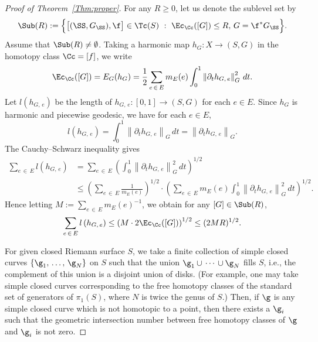 \begin{proof}[{Proof of Theorem~\ref{Thm:proper}}]
For any $R \ge 0$, let us denote the sublevel set by
\[
\Sub(R):=\Big\{\big[(\SS, G_\SS), \f\big] \in \Tc(S) \ : \ \Ec_\Cc([G]) \le R, \, G=\f^\ast G_\SS\Big\}.
\]
Assume that $\Sub(R) \neq \emptyset$. Taking a harmonic map $h_G: X \to (S, G)$ in the homotopy class $\Cc=[f]$, we write
\[
\Ec_\Cc([G])=E_G(h_G)=\frac{1}{2}\sum_{e\,\in \,E}m_E(e)\int_0^1\left\|\partial_t h_{G,\,e}\right\|_G^2\, dt.
\]
Let $l(h_{G,\,e})$ be the length of $h_{G, \,e}:[0, 1] \to (S, G)$ for each $e \in E$. Since $h_G$ is harmonic and piecewise geodesic, we have for each $e \in E$,
\[
l\left(h_{G,\,e}\right)=\int_0^1\left\|\partial_t h_{G,\,e}\right\|_G\, dt=\left\|\partial_t h_{G,\,e}\right\|_G.
\]
The Cauchy--Schwarz inequality gives
\begin{align*}
\sum_{e\,\in\,E}l\left(h_{G,\,e}\right) &= \sum_{e\,\in\,E}\left(\int_0^1 \left\|\partial_t h_{G,\,e}\right\|_G^2 \, dt\right)^{1/2} \\
&\le \left(\sum_{e\,\in\,E}\frac{1}{m_E(e)}\right)^{1/2}\cdot \left(\sum_{e\,\in\,E}m_E(e)\int_0^1 \left\|\partial_t h_{G,\,e}\right\|_G^2 \, dt\right)^{1/2}.
\end{align*}
Hence letting $M:=\sum_{e\,\in\,E}m_E(e)^{-1}$, we obtain for any $[G] \in \Sub(R)$,
\begin{equation}\label{Eq:length}
\sum_{e\,\in\,E}l\left(h_{G,\,e}\right) \le \left(M\cdot 2\Ec_{\Cc}([G])\right)^{1/2} \le (2 MR)^{1/2}.
\end{equation}


For given closed Riemann surface $S$, we take a finite collection of simple closed curves $\{\g_1,\,\dots,\,\g_N\}$ on $S$ such that the union $\g_1 \cup\,\cdots\,\cup \g_N$ fills $S$, i.e., the complement of this union is a disjoint union of disks. (For example, one may take simple closed curves corresponding to the free homotopy classes of the standard set of generators of $\pi_1(S)$, where $N$ is twice the genus of $S$.) Then, if $\g$ is any simple closed curve which is not homotopic to a point, then there exists a $\g_i$ such that the geometric intersection number between free homotopy classes of $\g$ and $\g_i$ is not zero.




\end{proof}
